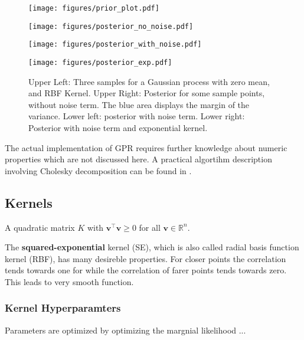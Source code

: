 \documentclass[english]{article}
\begin{document}
\begin{figure}

  \begin{minipage}{0.5\textwidth}
  \texttt{[image: figures/prior\_plot.pdf]}
  \end{minipage}%
  \begin{minipage}{0.5\textwidth}
  \texttt{[image: figures/posterior\_no\_noise.pdf]}
  \end{minipage}%

  \begin{minipage}{0.5\textwidth}
  \texttt{[image: figures/posterior\_with\_noise.pdf]}
  \end{minipage}%
  \begin{minipage}{0.5\textwidth}
  \texttt{[image: figures/posterior\_exp.pdf]}
  \end{minipage}%

  \caption{Upper Left: Three samples for a Gaussian process with zero mean, and RBF Kernel. Upper Right: Posterior for some sample points, without noise term. The blue area displays the margin of the variance. Lower left: posterior with noise term. Lower right: Posterior with noise term and exponential kernel.}

\end{figure}


The actual implementation of \ac{GPR} requires further knowledge about numeric properties which are not discussed here. A practical algortihm description involving Cholesky decomposition can be found in \cite[Algorithm 2.1]{rasmussen_gaussian_2006}.




\subsection{Kernels}
A quadratic matrix $K$ with $\mathbf{v}^\top \mathbf{v} \ge 0$ for all $\mathbf{v} \in \mathbb{R}^n$.

The \textbf{squared-exponential} kernel (SE), which is also called radial basis function kernel (RBF), has many desireble properties. For closer points the correlation tends towards one for while the correlation of farer points tends towards zero. This leads to very smooth function.



\subsubsection{Kernel Hyperparamters}
Parameters are optimized by optimizing the margnial likelihood ...
\end{document}
